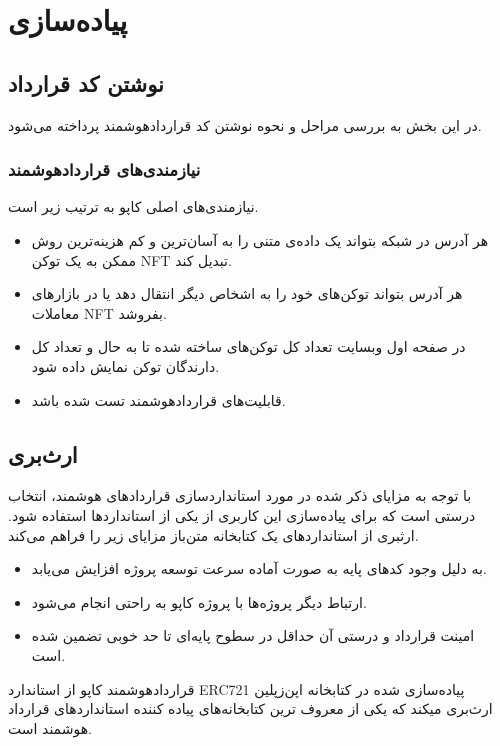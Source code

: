 \chapter{پیاده‌سازی}

\section{نوشتن کد قرارداد}
در این بخش به بررسی مراحل و نحوه نوشتن کد قراردادهوشمند پرداخته می‌شود.

\subsection{نیازمندی‌های قراردادهوشمند}
نیازمندی‌های اصلی کاپو به ترتیب زیر است.
\begin{itemize}
  \item
هر آدرس در شبکه بتواند یک داده‌ی متنی را به آسان‌ترین و کم هزینه‌ترین روش ممکن به یک توکن NFT تبدیل کند.
  \item
هر آدرس بتواند توکن‌های خود را به اشخاص دیگر انتقال دهد یا در بازارهای معاملات NFT بفروشد.
  \item
در صفحه اول وبسایت تعداد کل توکن‌های ساخته شده تا به حال و تعداد کل دارندگان توکن نمایش داده شود.
  \item
قابلیت‌های قراردادهوشمند تست شده باشد.
\end{itemize}

\section{ارث‌بری}
با توجه به مزایای ذکر شده در مورد استانداردسازی قراردادهای هوشمند، انتخاب درستی است که برای پیاده‌سازی این کاربری از یکی از استانداردها استفاده شود. ارثبری از استانداردهای یک کتابخانه متن‌باز مزایای زیر را فراهم می‌کند.
\begin{itemize}
  \item
به دلیل وجود کدهای پایه به صورت آماده سرعت توسعه پروژه افزایش می‌یابد.
  \item
ارتباط دیگر پروژه‌ها با پروژه کاپو به راحتی انجام می‌شود.
  \item
امینت قرارداد و درستی آن حداقل در سطوح پایه‌ای تا حد خوبی تضمین شده است.
\end{itemize}

قراردادهوشمند کاپو از استاندارد ERC721 پیاده‌سازی شده در کتابخانه اپن‌زپلین
ارث‌بری میکند که یکی از معروف ترین کتابخانه‌های پیاده کننده استانداردهای قرارداد هوشمند است.

